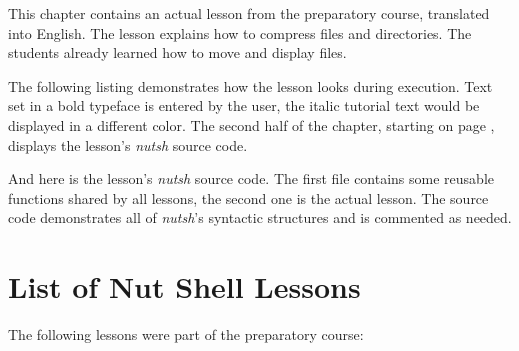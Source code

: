\documentclass[paper=a4,twoside,abstract=on,cleardoublepage=empty,numbers=noenddot,toc=bib,toc=listof,12pt,appendixprefix=true]{scrreprt}
\begin{document}
This chapter contains an actual lesson from the preparatory course, translated into English. The lesson explains how to compress files and directories. The students already learned how to move and display files.

The following listing demonstrates how the lesson looks during execution. Text set in a bold typeface is entered by the user, the italic tutorial text would be displayed in a different color. The second half of the chapter, starting on page , displays the lesson's \emph{nutsh} source code.


%
And here is the lesson's \emph{nutsh} source code. The first file contains some reusable functions shared by all lessons, the second one is the actual lesson. The source code demonstrates all of \emph{nutsh}'s syntactic structures and is commented as needed.

\label{lst:compress}




\chapter{List of Nut Shell Lessons}
\label{sec:lessons}

The following lessons were part of the preparatory course:
\end{document}
